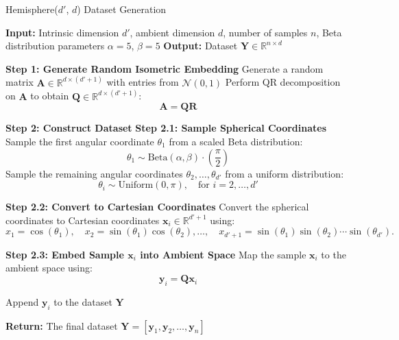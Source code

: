 \begin{algorithm}[H]
    \caption{Hemisphere($d'$, $d$) Dataset Generation}
    \begin{algorithmic}[1]
        \STATE \textbf{Input:} Intrinsic dimension $d'$, ambient dimension $d$, number of samples $n$, Beta distribution parameters $\alpha = 5$, $\beta = 5$
        \STATE \textbf{Output:} Dataset $\mathbf{Y} \in \mathbb{R}^{n \times d}$

        \STATE \textbf{Step 1: Generate Random Isometric Embedding}
        \STATE Generate a random matrix $\mathbf{A} \in \mathbb{R}^{d \times (d'+1)}$ with entries from $\mathcal{N}(0, 1)$
        \STATE Perform QR decomposition on $\mathbf{A}$ to obtain $\mathbf{Q} \in \mathbb{R}^{d \times (d'+1)}$:
        \[
        \mathbf{A} = \mathbf{Q} \mathbf{R}
        \]

        \STATE \textbf{Step 2: Construct Dataset}
            \STATE \textbf{Step 2.1: Sample Spherical Coordinates}
            \STATE Sample the first angular coordinate $\theta_1$ from a scaled Beta distribution:
            \[
            \theta_1 \sim \text{Beta}(\alpha, \beta) \cdot \left( \frac{\pi}{2} \right)
            \]
            \STATE Sample the remaining angular coordinates $\theta_2, \dots, \theta_{d'}$ from a uniform distribution:
            \[
            \theta_i \sim \text{Uniform}(0, \pi), \quad \text{for } i = 2, \dots, d'
            \]

            \STATE \textbf{Step 2.2: Convert to Cartesian Coordinates}
            \STATE Convert the spherical coordinates to Cartesian coordinates $\mathbf{x}_i \in \mathbb{R}^{d'+1}$ using:
            \[
            x_1 = \cos(\theta_1), \quad x_2 = \sin(\theta_1) \cos(\theta_2), \dots, \quad x_{d'+1} = \sin(\theta_1) \sin(\theta_2) \cdots \sin(\theta_{d'}).
            \]

            \STATE \textbf{Step 2.3: Embed Sample $\mathbf{x}_i$ into Ambient Space}
            \STATE Map the sample $\mathbf{x}_i$ to the ambient space using:
            \[
            \mathbf{y}_i = \mathbf{Q} \mathbf{x}_i
            \]

            \STATE Append $\mathbf{y}_i$ to the dataset $\mathbf{Y}$
        \ENDFOR
        
        \STATE \textbf{Return:} The final dataset $\mathbf{Y} = [\mathbf{y}_1, \mathbf{y}_2, \dots, \mathbf{y}_n]$
    \end{algorithmic}
\end{algorithm}

